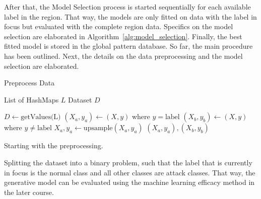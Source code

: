 After that, the Model Selection process is started sequentially for each available label in the region. That way, the models are only fitted on data with the label in focus but evaluated with the complete region data. Specifics on the model selection are elaborated in Algorithm~\ref{alg:model_selection}. Finally, the best fitted model is stored in the global pattern database. So far, the main procedure has been outlined. Next, the details on the data preprocessing and the model selection are elaborated.

 \begin{algorithm}
    \caption{Preprocess Data}
    \label{alg:data_preprocessing}
 
    \begin{algorithmic}[1]
        \REQUIRE List of HashMaps $L$
        \ENSURE Dataset $D$
        
        \STATE $D \leftarrow \text{getValues(L)}$
                \STATE {}
                \STATE $(X_a, y_a) \leftarrow (X, y)$ where $y=\text{label}$ 
                \STATE $(X_b, y_b) \leftarrow (X, y)$ where $y \neq \text{label}$
                    \STATE $X_a, y_a \leftarrow \text{upsample}(X_a, y_a)$
                \ENDIF
            \ENDIF
        \ENDFOR
        \RETURN $(X_a, y_a), (X_b, y_b)$
    \end{algorithmic}
 \end{algorithm}

 Starting with the preprocessing.

 Splitting the dataset into a binary problem, such that the label that is currently in focus is the normal class and all other classes are attack classes. That way, the generative model can be evaluated using the machine learning efficacy method in the later course. 

